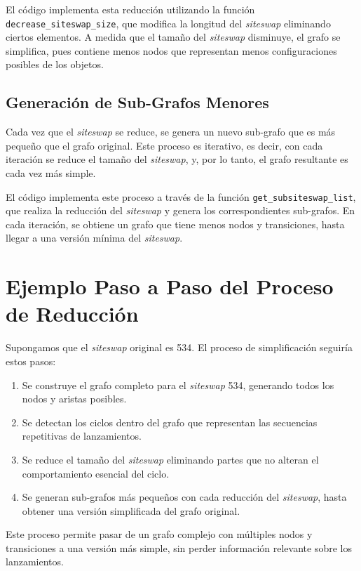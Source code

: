 \documentclass[a4paper,12pt]{article}
\begin{document}
El código implementa esta reducción utilizando la función \texttt{decrease\_siteswap\_size}, que modifica la longitud del \emph{siteswap} eliminando ciertos elementos. A medida que el tamaño del \emph{siteswap} disminuye, el grafo se simplifica, pues contiene menos nodos que representan menos configuraciones posibles de los objetos.

\subsection{Generación de Sub-Grafos Menores}

Cada vez que el \emph{siteswap} se reduce, se genera un nuevo sub-grafo que es más pequeño que el grafo original. Este proceso es iterativo, es decir, con cada iteración se reduce el tamaño del \emph{siteswap}, y, por lo tanto, el grafo resultante es cada vez más simple. 

El código implementa este proceso a través de la función \texttt{get\_subsiteswap\_list}, que realiza la reducción del \emph{siteswap} y genera los correspondientes sub-grafos. En cada iteración, se obtiene un grafo que tiene menos nodos y transiciones, hasta llegar a una versión mínima del \emph{siteswap}.

\section{Ejemplo Paso a Paso del Proceso de Reducción}

Supongamos que el \emph{siteswap} original es 534. El proceso de simplificación seguiría estos pasos:

\begin{enumerate}
    \item Se construye el grafo completo para el \emph{siteswap} 534, generando todos los nodos y aristas posibles.
    \item Se detectan los ciclos dentro del grafo que representan las secuencias repetitivas de lanzamientos.
    \item Se reduce el tamaño del \emph{siteswap} eliminando partes que no alteran el comportamiento esencial del ciclo.
    \item Se generan sub-grafos más pequeños con cada reducción del \emph{siteswap}, hasta obtener una versión simplificada del grafo original.
\end{enumerate}

Este proceso permite pasar de un grafo complejo con múltiples nodos y transiciones a una versión más simple, sin perder información relevante sobre los lanzamientos.
\end{document}
